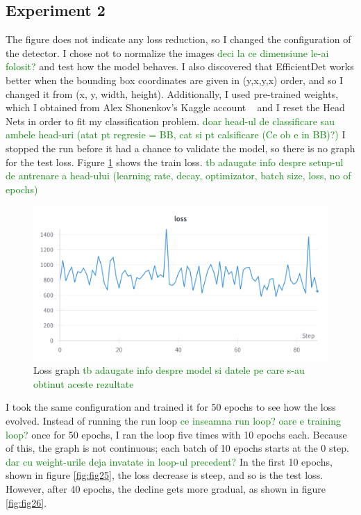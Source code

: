 \subsection{Experiment 2}

The figure does not indicate any loss reduction, so I changed the configuration of the detector. I chose not to normalize the images
\textcolor{green}{deci la ce dimensiune le-ai folosit?}
and test how the model behaves. I also discovered that EfficientDet works better when the bounding box coordinates are given in (y,x,y,x) order, and so I changed it from (x, y, width, height). Additionally, I used pre-trained weights, which I obtained from Alex Shonenkov's Kaggle account ~\cite{link6} and I reset the Head Nets in order to fit my classification problem. 
\textcolor{green}{doar head-ul de classificare sau ambele head-uri (atat pt regresie = BB, cat si pt calsificare (Ce ob e in BB)?)} 
I stopped the run before it had a chance to validate the model, so there is no graph for the test loss. Figure \ref{fig:fig24} shows the train loss.
\textcolor{green}{tb adaugate info despre setup-ul de antrenare a head-ului (learning rate, decay, optimizator, batch size, loss, no of epochs)}

\begin{figure}[!ht]
    \centering
    \includegraphics[width=1\linewidth]{figures/Figure27.png}
    \caption{Loss graph
    \textcolor{green}{tb adaugate info despre model si datele pe care s-au obtinut aceste rezultate}
    }
    \label{fig:fig24}
\end{figure}



I took the same configuration and trained it for 50 epochs to see how the loss evolved. Instead of running the run loop
\textcolor{green}{ce inseamna run loop? oare e training loop?} 
once for 50 epochs, I ran the loop five times with 10 epochs each. Because of this, the graph is not continuous; each batch of 10 epochs starts at the 0 step. 
\textcolor{green}{dar cu weight-urile deja invatate in loop-ul precedent?} 
In the first 10 epochs, shown in figure \ref{fig:fig25}, the loss decrease is steep, and so is the test loss. However, after 40 epochs, the decline gets more gradual, as shown in figure \ref{fig:fig26}.

